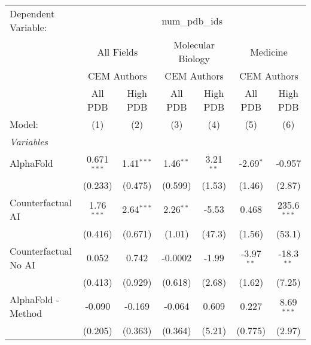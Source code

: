 \begingroup
\centering
\begin{tabular}{lcccccc}
   \tabularnewline \midrule \midrule
   Dependent Variable: & \multicolumn{6}{c}{num\_pdb\_ids}\\
 & \multicolumn{2}{c}{All Fields} & \multicolumn{2}{c}{Molecular Biology} & \multicolumn{2}{c}{Medicine} \\
\cmidrule(lr){2-3} \cmidrule(lr){4-5} \cmidrule(lr){6-7}
 & \multicolumn{2}{c}{CEM Authors} & \multicolumn{2}{c}{CEM Authors} & \multicolumn{2}{c}{CEM Authors} \\
\cmidrule(lr){2-3} \cmidrule(lr){4-5} \cmidrule(lr){6-7}
 & \multicolumn{1}{c}{All PDB} & \multicolumn{1}{c}{High PDB} & \multicolumn{1}{c}{All PDB} & \multicolumn{1}{c}{High PDB} & \multicolumn{1}{c}{All PDB} & \multicolumn{1}{c}{High PDB} \\
\cmidrule(lr){2-2} \cmidrule(lr){3-3} \cmidrule(lr){4-4} \cmidrule(lr){5-5} \cmidrule(lr){6-6} \cmidrule(lr){7-7}
   Model:                                                     & (1)           & (2)          & (3)          & (4)         & (5)          & (6)\\  
   \midrule
   \emph{Variables}\\
   AlphaFold                                                  & 0.671$^{***}$ & 1.41$^{***}$ & 1.46$^{**}$  & 3.21$^{**}$ & -2.69$^{*}$  & -0.957\\   
                                                              & (0.233)       & (0.475)      & (0.599)      & (1.53)      & (1.46)       & (2.87)\\   
   Counterfactual AI                                          & 1.76$^{***}$  & 2.64$^{***}$ & 2.26$^{**}$  & -5.53       & 0.468        & 235.6$^{***}$\\   
                                                              & (0.416)       & (0.671)      & (1.01)       & (47.3)      & (1.56)       & (53.1)\\   
   Counterfactual No AI                                       & 0.052         & 0.742        & -0.0002      & -1.99       & -3.97$^{**}$ & -18.3$^{**}$\\   
                                                              & (0.413)       & (0.929)      & (0.618)      & (2.68)      & (1.62)       & (7.25)\\   
   AlphaFold - Method                                         & -0.090        & -0.169       & -0.064       & 0.609       & 0.227        & 8.69$^{***}$\\   
                                                              & (0.205)       & (0.363)      & (0.364)      & (5.21)      & (0.775)      & (2.97)\\   

\end{tabular}
